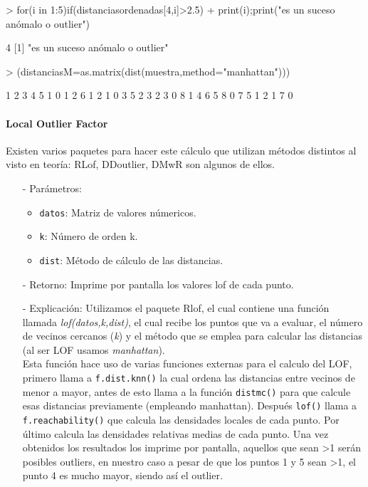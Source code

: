 \documentclass[a4paper, 12pt]{article}
\begin{document}
\begin{Schunk}
\begin{Sinput}
> for(i in 1:5){if(distanciasordenadas[4,i]>2.5)
+ {print(i);print("es un suceso anómalo o outlier")}}
\end{Sinput}
\begin{Soutput}
[1] 4
[1] "es un suceso anómalo o outlier"
\end{Soutput}
\begin{Sinput}
> (distanciasM=as.matrix(dist(muestra,method="manhattan")))
\end{Sinput}
\begin{Soutput}
  1 2 3 4 5
1 0 1 2 6 1
2 1 0 3 5 2
3 2 3 0 8 1
4 6 5 8 0 7
5 1 2 1 7 0
\end{Soutput}
\end{Schunk}
	
	\paragraph{Local Outlier Factor}
	Existen varios paquetes para hacer este cálculo que utilizan métodos distintos al visto en teoría: RLof, DDoutlier, DMwR son algunos de ellos.
	\begin{itemize}
		\item[-] Parámetros:
		\begin{itemize}
			\item \texttt{datos}: Matriz de valores númericos.
			\item \texttt{k}: Número de orden k.
			\item \texttt{dist}: Método de cálculo de las distancias.
		\end{itemize}

		\item[-] Retorno: Imprime por pantalla los valores lof de cada punto.
		
		\item[-] Explicación: Utilizamos el paquete Rlof, el cual contiene una función llamada \emph{lof(datos,k,dist)}, el cual recibe los puntos que va a evaluar, el número de vecinos cercanos (\emph{k}) y el método que se emplea para calcular las distancias (al ser LOF usamos \emph{manhattan}). \\
		Esta función hace uso de varias funciones externas para el calculo del LOF, primero llama a \texttt{f.dist.knn()} la cual ordena las distancias entre vecinos de menor a mayor, antes de esto llama a la función \texttt{distmc()} para que calcule esas distancias previamente (empleando manhattan). Después \texttt{lof()} llama a \texttt{f.reachability()} que calcula las densidades locales de cada punto. Por último calcula las densidades relativas medias de cada punto. Una vez obtenidos los resultados los imprime por pantalla, aquellos que sean >1 serán posibles outliers, en nuestro caso a pesar de que los puntos 1 y 5 sean >1, el punto 4 es mucho mayor, siendo así el outlier.\\ 
	\end{itemize}
\end{document}
